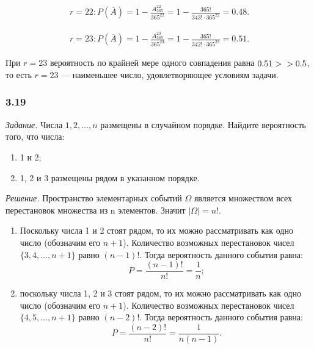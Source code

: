 \begin{equation*}
\begin{split}
r = 22 :
P \left( \overline{A} \right) =
1 - \frac{A_{365}^{22}}{365^{22}} =
1 - \frac{365!}{343! \cdot 365^{22}} =
0.48.
\end{split}
\end{equation*}

\begin{equation*}
\begin{split}
r = 23 :
P \left( \overline{A} \right) =
1 - \frac{A_{365}^{23}}{365^{23}} =
1 - \frac{365!}{342! \cdot 365^{23}} =
0.51.
\end{split}
\end{equation*}

При
$ r = 23 $
вероятность по крайней мере одного совпадения равна
$ 0.51 > \\
> 0.5 $,
то есть
$ r = 23 $ ---
наименьшее число, удовлетворяющее условиям задачи.

\subsubsection*{3.19}

\textit{Задание.} Числа $ 1, 2,  \dotsc , n $ размещены в случайном порядке.
Найдите вероятность того, что числа:
\begin{enumerate}[label=\alph*)]
\item 1 и 2;
\item 1, 2 и 3 размещены рядом в указанном порядке.
\end{enumerate}

\textit{Решение.} Пространство элементарных событий $  \Omega$ является множеством всех перестановок множества из n элементов.
Значит $ |\Omega| = n! $.

\begin{enumerate}[label=\alph*)]
\item Поскольку числа 1 и 2 стоят рядом, то их можно рассматривать как одно число (обозначим его $ n + 1 $).
Количество возможных перестановок чисел $ \{ 3, 4,  \dotsc , n + 1 \} $ равно $ \left( n - 1 \right)! $.
Тогда вероятность данного события равна:
$$ P =
\frac{ \left( n - 1 \right)! }{ n! } =
\frac{1}{n};$$

\item поскольку числа 1, 2 и 3 стоят рядом, то их можно рассматривать как одно число (обозначим его $ n + 1 $).
Количество возможных перестановок чисел $ \{ 4, 5,  \dotsc , n + 1 \} $ равно $ \left( n - 2 \right)! $.
Тогда вероятность данного события равна:
$$ P = \frac{ \left( n - 2 \right)!}{ n! } =
\frac{1}{ n (n - 1 ) }.$$
\end{enumerate}

